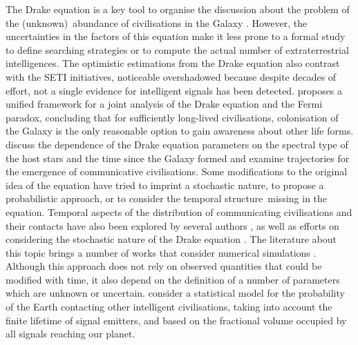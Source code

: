 \documentclass[crop]{CSLB}
\begin{document}
%
The Drake equation is a key tool to organise the discussion about the
problem of the (unknown) abundance of civilisations in the Galaxy
\citep{hinkel_interdisciplinary_2019}.
%
However, the uncertainties in the factors of this equation make it
less prone to a formal study to define searching strategies or to
compute the actual number of extraterrestrial intelligences.
%
The optimistic estimations from the Drake equation also contrast with
the SETI initiatives, noticeable overshadowed because despite decades
of effort, not a single evidence for intelligent signals has been
detected.
%
\citet{prantzos_joint_2013} proposes a unified framework for a joint
analysis of the Drake equation and the Fermi paradox, concluding that
for sufficiently long-lived civilisations, colonisation of the Galaxy
is the only reasonable option to gain awareness about other life
forms.
%
\citet{haqq-misra_drake_2017} discuss the dependence of the Drake
equation parameters on the spectral type of the host stars and the
time since the Galaxy formed and examine trajectories for the
emergence of communicative civilisations.
%
Some modifications to the original idea of the equation have tried to
imprint a stochastic nature, to propose a probabilistic approach, or
to consider the temporal structure missing in the equation.
%
Temporal aspects of the distribution of communicating civilisations
and their contacts have also been explored by several authors
\citep{fogg_temporal_1987, forgan_spatiotemporal_2011,
balbi_impact_2018, balb_spatiotemporal_2018, horvat_impact_2011}, as
well as efforts on considering the stochastic nature of the Drake
equation \citep{glade_stochastic_2011}.
%
The literature about this topic brings a number of works that consider
numerical simulations \citep{forgan_evaluating_2015,
vukotic_grandeur_2016, murante_simulating_2015, forgan_numerical_2009,
forgan_galactic_2017, ramirez_new_2017}.
%
Although this approach does not rely on observed quantities that could
be modified with time, it also depend on the definition of a number of
parameters which are unknown or uncertain.
%
\citet{grimaldi_signal_2017} consider a statistical model for the
probability of the Earth contacting other intelligent civilisations,
taking into account the finite lifetime of signal emitters, and based
on the fractional volume occupied by all signals reaching our planet.
\end{document}
